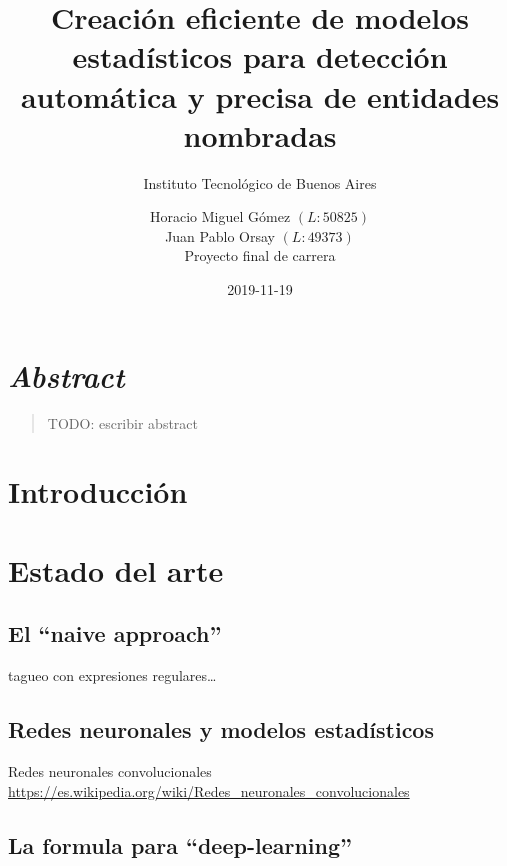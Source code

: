 \documentclass[12pt,a4paper,]{scrartcl}
\title{Creación eficiente de modelos estadísticos para detección automática y precisa de entidades nombradas}
\subtitle{Instituto Tecnológico de Buenos Aires}
\author{Horacio Miguel Gómez \((L:50825)\) \\ Juan Pablo Orsay \((L:49373)\) \\ Proyecto final de carrera}
\date{2019-11-19}
\begin{document}
\maketitle

{
\setcounter{tocdepth}{2}
\tableofcontents
}
\newpage

\hypertarget{abstract}{%
\section*{\texorpdfstring{\emph{Abstract}}{Abstract}}\label{abstract}}

\begin{quote}
TODO: escribir abstract
\end{quote}

\hypertarget{intro}{%
\section{Introducción}\label{intro}}

\hypertarget{state-of-art}{%
\section{Estado del arte}\label{state-of-art}}

\hypertarget{el-naive-approach}{%
\subsection{\texorpdfstring{El \enquote{naive approach}}{El ``naive approach''}}\label{el-naive-approach}}

tagueo con expresiones regulares\ldots{}

\hypertarget{redes-neuronales-y-modelos-estaduxedsticos}{%
\subsection{Redes neuronales y modelos estadísticos}\label{redes-neuronales-y-modelos-estaduxedsticos}}

Redes neuronales convolucionales
\url{https://es.wikipedia.org/wiki/Redes_neuronales_convolucionales}

\hypertarget{la-formula-para-deep-learning}{%
\subsection{\texorpdfstring{La formula para \enquote{deep-learning}}{La formula para ``deep-learning''}}\label{la-formula-para-deep-learning}}
\end{document}
